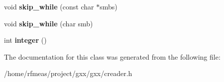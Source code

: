\begin{DoxyCompactItemize}
\item 
void {\bfseries skip\+\_\+while} (const char $\ast$smbs)\hypertarget{classgxx_1_1creader_ae2f003d928c118a62029303ccb09a18f}{}\label{classgxx_1_1creader_ae2f003d928c118a62029303ccb09a18f}

\item 
void {\bfseries skip\+\_\+while} (char smb)\hypertarget{classgxx_1_1creader_ad408f67fe181235640b1fcd8c6141c50}{}\label{classgxx_1_1creader_ad408f67fe181235640b1fcd8c6141c50}

\item 
int {\bfseries integer} ()\hypertarget{classgxx_1_1creader_a7aeef0969b937dca7c314bf95f9f51c1}{}\label{classgxx_1_1creader_a7aeef0969b937dca7c314bf95f9f51c1}

\end{DoxyCompactItemize}


The documentation for this class was generated from the following file\+:\begin{DoxyCompactItemize}
\item 
/home/rfmeas/project/gxx/gxx/creader.\+h\end{DoxyCompactItemize}

